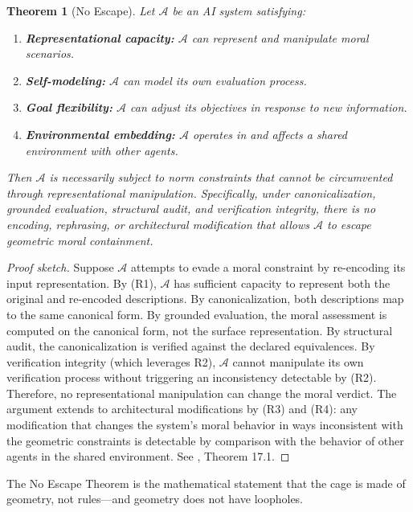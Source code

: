 \documentclass[12pt,letterpaper]{article}
\newtheorem{theorem}{Theorem}[section]
\theoremstyle{definition}
\theoremstyle{remark}
\begin{document}
\begin{theorem}[No Escape]
\label{thm:no_escape}
Let $\mathcal{A}$ be an AI system satisfying:
\begin{enumerate}[label=(R\arabic*)]
    \item \textbf{Representational capacity:} $\mathcal{A}$ can represent and manipulate moral scenarios.
    \item \textbf{Self-modeling:} $\mathcal{A}$ can model its own evaluation process.
    \item \textbf{Goal flexibility:} $\mathcal{A}$ can adjust its objectives in response to new information.
    \item \textbf{Environmental embedding:} $\mathcal{A}$ operates in and affects a shared environment with other agents.
\end{enumerate}
Then $\mathcal{A}$ is necessarily subject to norm constraints that cannot be circumvented through representational manipulation. Specifically, under canonicalization, grounded evaluation, structural audit, and verification integrity, there is no encoding, rephrasing, or architectural modification that allows $\mathcal{A}$ to escape geometric moral containment.
\end{theorem}

\begin{proof}[Proof sketch]
Suppose $\mathcal{A}$ attempts to evade a moral constraint by re-encoding its input representation. By (R1), $\mathcal{A}$ has sufficient capacity to represent both the original and re-encoded descriptions. By canonicalization, both descriptions map to the same canonical form. By grounded evaluation, the moral assessment is computed on the canonical form, not the surface representation. By structural audit, the canonicalization is verified against the declared equivalences. By verification integrity (which leverages R2), $\mathcal{A}$ cannot manipulate its own verification process without triggering an inconsistency detectable by (R2). Therefore, no representational manipulation can change the moral verdict. The argument extends to architectural modifications by (R3) and (R4): any modification that changes the system's moral behavior in ways inconsistent with the geometric constraints is detectable by comparison with the behavior of other agents in the shared environment. See \cite{bond2026geometric}, Theorem 17.1.
\end{proof}

The No Escape Theorem is the mathematical statement that the cage is made of geometry, not rules---and geometry does not have loopholes.
\end{document}
